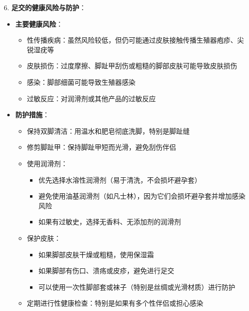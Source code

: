 \documentclass[12pt,UTF8]{ctexbook}
\begin{document}
6. \textbf{足交的健康风险与防护}：
\begin{itemize}
	\item \textbf{主要健康风险}：
	\begin{itemize}
		\item 性传播疾病：虽然风险较低，但仍可能通过皮肤接触传播生殖器疱疹、尖锐湿疣等
		\item 皮肤损伤：过度摩擦、脚趾甲刮伤或粗糙的脚部皮肤可能导致皮肤损伤
		\item 感染：脚部细菌可能导致生殖器感染
		\item 过敏反应：对润滑剂或其他产品的过敏反应
	\end{itemize}
	\item \textbf{防护措施}：
	\begin{itemize}
		\item 保持双脚清洁：用温水和肥皂彻底洗脚，特别是脚趾缝
		\item 修剪脚趾甲：保持脚趾甲短而光滑，避免刮伤伴侣
		\item 使用润滑剂：
		\begin{itemize}
			\item 优先选择水溶性润滑剂（易于清洗，不会损坏避孕套）
			\item 避免使用油基润滑剂（如凡士林），因为它们会损坏避孕套并增加感染风险
			\item 如果有过敏史，选择无香料、无添加剂的润滑剂
		\end{itemize}
		\item 保护皮肤：
		\begin{itemize}
			\item 如果脚部皮肤干燥或粗糙，使用保湿霜
			\item 如果脚部有伤口、溃疡或皮疹，避免进行足交
			\item 可以使用一次性脚部套或袜子（特别是丝绸或光滑材质）进行防护
		\end{itemize}
		\item 定期进行性健康检查：特别是如果有多个性伴侣或担心感染
	\end{itemize}
\end{itemize}
\end{document}
